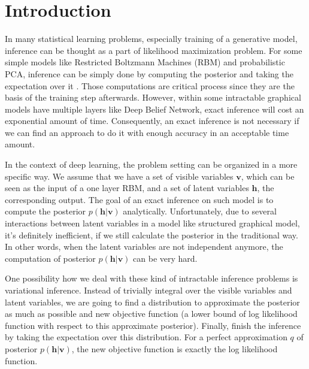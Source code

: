 \documentclass[conference]{IEEEtran}
\begin{document}
%
\IEEEpeerreviewmaketitle



\section{Introduction}
In many statistical learning problems, especially training of a generative model, inference can be thought as a part of likelihood maximization problem. For some simple models like Restricted Boltzmann Machines (RBM) and probabilistic PCA, inference can be simply done by computing the posterior and taking the expectation over it \cite{Goodfellow-et-al-2016}. Those computations are critical process since they are the basis of the training step afterwards. However, within some intractable graphical models have multiple layers like Deep Belief Network, exact inference will cost an exponential amount of time. Consequently, an exact inference is not necessary if we can find an approach to do it with enough accuracy in an acceptable time amount.

In the context of deep learning, the problem setting can be organized in a more specific way. We assume that we have a set of visible variables $\boldsymbol{v}$, which can be seen as the input of a one layer RBM, and a set of latent variables $\boldsymbol{h}$, the corresponding output. The goal of an exact inference on such model is to compute the posterior $p(\boldsymbol{h} | \boldsymbol{v})$ analytically. Unfortunately, due to several interactions between latent variables in a model like structured graphical model, it's definitely inefficient, if we still calculate the posterior in the traditional way. In other words, when the latent variables are not independent anymore, the computation of posterior $p(\boldsymbol{h} | \boldsymbol{v})$ can be very hard.

One possibility how we deal with these kind of intractable inference problems is variational inference. Instead of trivially integral over the visible variables and latent variables, we are going to find a distribution to approximate the posterior as much as possible and new objective function (a lower bound of log likelihood function with respect to this approximate posterior). Finally, finish the inference by taking the expectation over this distribution. For a perfect approximation $q$ of posterior $p(\boldsymbol{h} | \boldsymbol{v})$, the new objective function is exactly the log likelihood function.
\end{document}
